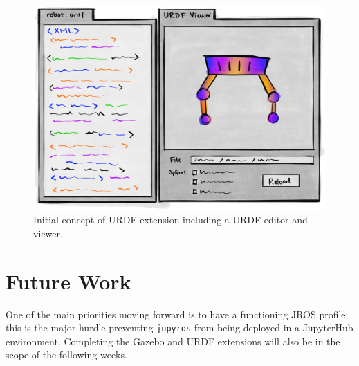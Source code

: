     \begin{figure}[H]
        \centering
        \includegraphics[width=\linewidth]{Images/10_urdfPlan.png}
        \caption{Initial concept of URDF extension including a URDF editor and viewer.}
        \label{fig:urdfPlan}
    \end{figure}

\section{Future Work}

    One of the main priorities moving forward is to have a functioning JROS profile; this is the major hurdle preventing \texttt{jupyros} from being deployed in a JupyterHub environment. Completing the Gazebo and URDF extensions will also be in the scope of the following weeks.
